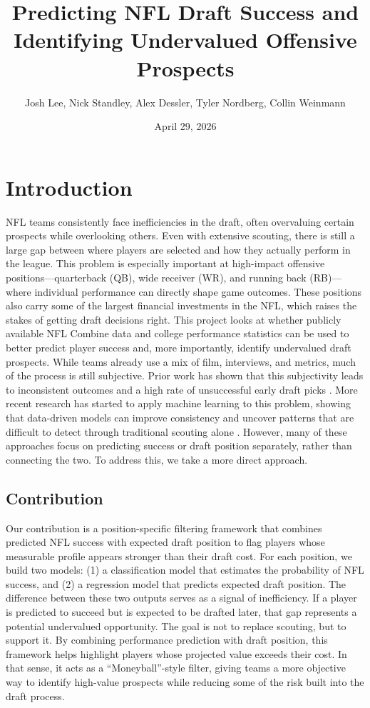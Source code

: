 \documentclass[10pt,twocolumn]{article}
\title{\textbf{Predicting NFL Draft Success and Identifying Undervalued Offensive Prospects}}
\author{Josh Lee, Nick Standley, Alex Dessler, Tyler Nordberg, Collin Weinmann}
\affil{STAT 421 Final Paper \\ Texas A\&M University}
\date{April 29, 2026}
\begin{document}
\maketitle
\thispagestyle{empty}


\section{Introduction}

NFL teams consistently face inefficiencies in the draft, often overvaluing certain prospects while overlooking others. Even with extensive scouting, there is still a large gap between where players are selected and how they actually perform in the league. This problem is especially important at high-impact offensive positions—quarterback (QB), wide receiver (WR), and running back (RB)—where individual performance can directly shape game outcomes. These positions also carry some of the largest financial investments in the NFL, which raises the stakes of getting draft decisions right. This project looks at whether publicly available NFL Combine data and college performance statistics can be used to better predict player success and, more importantly, identify undervalued draft prospects. While teams already use a mix of film, interviews, and metrics, much of the process is still subjective. Prior work has shown that this subjectivity leads to inconsistent outcomes and a high rate of unsuccessful early draft picks . More recent research has started to apply machine learning to this problem, showing that data-driven models can improve consistency and uncover patterns that are difficult to detect through traditional scouting alone . However, many of these approaches focus on predicting success or draft position separately, rather than connecting the two. To address this, we take a more direct approach. 

\subsection{Contribution}
Our contribution is a position-specific filtering framework that combines predicted NFL success with expected draft position to flag players whose measurable profile appears stronger than their draft cost. For each position, we build two models: (1) a classification model that estimates the probability of NFL success, and (2) a regression model that predicts expected draft position. The difference between these two outputs serves as a signal of inefficiency. If a player is predicted to succeed but is expected to be drafted later, that gap represents a potential undervalued opportunity. The goal is not to replace scouting, but to support it. By combining performance prediction with draft position, this framework helps highlight players whose projected value exceeds their cost. In that sense, it acts as a “Moneyball”-style filter, giving teams a more objective way to identify high-value prospects while reducing some of the risk built into the draft process.
\end{document}
